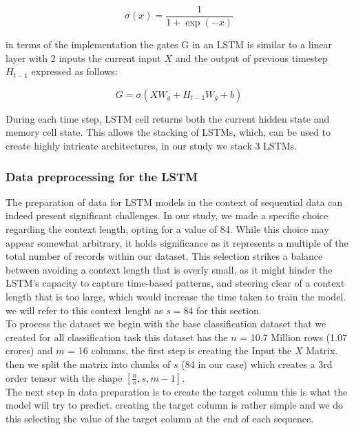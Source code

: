 \documentclass{article}
\begin{document}
\begin{equation}
    \sigma(x) = \frac{1}{1+\exp(-x)}
\end{equation}

in terms of the implementation the gates G in an LSTM is similar to a linear layer with 2 inputs the current input $X$ and the output of previous timestep $H_{t-1}$ expressed as follows:

\begin{equation}
    G = \sigma(XW_g + H_{t-1}W_g + b)
\end{equation}

During each time step, LSTM cell returns both the current hidden state and memory cell state. This allows the stacking of LSTMs, which, can be used to create highly intricate architectures, in our study we stack 3 LSTMs.\\

\subsubsection{Data preprocessing for the LSTM}

The preparation of data for LSTM models in the context of sequential data can indeed present significant challenges. In our study, we made a specific choice regarding the context length, opting for a value of 84. While this choice may appear somewhat arbitrary, it holds significance as it represents a multiple of the total number of records within our dataset. This selection strikes a balance between avoiding a context length that is overly small, as it might hinder the LSTM's capacity to capture time-based patterns, and steering clear of a context length that is too large, which would increase the time taken to train the model. we will refer to this context lenght as $s = 84$ for this section.\\

To process the dataset we begin with the base classification dataset that we created for all classification task this dataset has the $n$ = 10.7 Million rows (1.07 crores) and $m$ = 16 columns, the first step is creating the Input the $X$ Matrix. then we split the matrix into chunks of $s$ (84 in our case) which creates a 3rd order tensor with the shape $\left[ \frac{n}{s}, s, m - 1 \right]$.\\

The next step in data preparation is to create the target column this is what the model will try to predict. creating the target column is rather simple and we do this selecting the value of the target column at the end of each sequence. 
\end{document}
